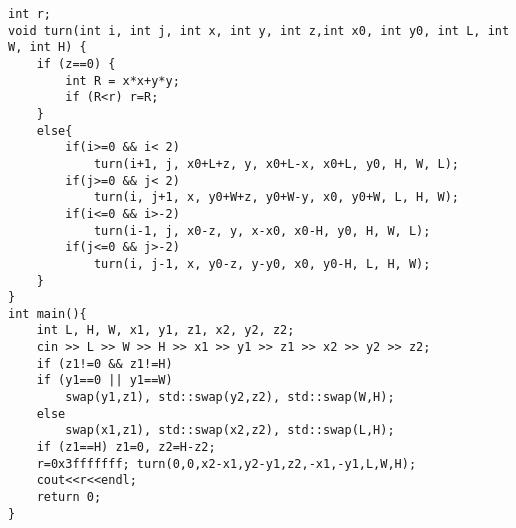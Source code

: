 \begin{lstlisting}
int r;
void turn(int i, int j, int x, int y, int z,int x0, int y0, int L, int W, int H) {
	if (z==0) {
		int R = x*x+y*y;
		if (R<r) r=R;
	}
	else{
		if(i>=0 && i< 2)
			turn(i+1, j, x0+L+z, y, x0+L-x, x0+L, y0, H, W, L);
		if(j>=0 && j< 2)
			turn(i, j+1, x, y0+W+z, y0+W-y, x0, y0+W, L, H, W);
		if(i<=0 && i>-2)
			turn(i-1, j, x0-z, y, x-x0, x0-H, y0, H, W, L);
		if(j<=0 && j>-2)
			turn(i, j-1, x, y0-z, y-y0, x0, y0-H, L, H, W);
	}
}
int main(){
	int L, H, W, x1, y1, z1, x2, y2, z2;
	cin >> L >> W >> H >> x1 >> y1 >> z1 >> x2 >> y2 >> z2;
	if (z1!=0 && z1!=H)
	if (y1==0 || y1==W)
		swap(y1,z1), std::swap(y2,z2), std::swap(W,H);
	else
		swap(x1,z1), std::swap(x2,z2), std::swap(L,H);
	if (z1==H) z1=0, z2=H-z2;
	r=0x3fffffff; turn(0,0,x2-x1,y2-y1,z2,-x1,-y1,L,W,H);
	cout<<r<<endl;
	return 0;
}
	\end{lstlisting}
